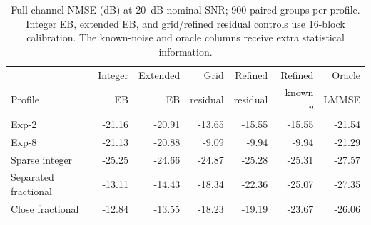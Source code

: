 \begin{table}[t]
\centering
\caption{Full-channel NMSE (dB) at 20~dB nominal SNR; 900 paired groups per profile. Integer EB, extended EB, and grid/refined residual controls use 16-block calibration. The known-noise and oracle columns receive extra statistical information.}
\label{tab:reconstruction}
\small\setlength{\tabcolsep}{4pt}
\begin{tabular}{lrrrrrr}
\toprule
& Integer & Extended & Grid & Refined & Refined & Oracle \\
Profile & EB & EB & residual & residual & known $v$ & LMMSE \\
\midrule
Exp-2 & -21.16 & -20.91 & -13.65 & -15.55 & -15.55 & -21.54 \\
Exp-8 & -21.13 & -20.88 & -9.09 & -9.94 & -9.94 & -21.29 \\
Sparse integer & -25.25 & -24.66 & -24.87 & -25.28 & -25.31 & -27.57 \\
Separated fractional & -13.11 & -14.43 & -18.34 & -22.36 & -25.07 & -27.35 \\
Close fractional & -12.84 & -13.55 & -18.23 & -19.19 & -23.67 & -26.06 \\
\bottomrule
\end{tabular}
\end{table}
